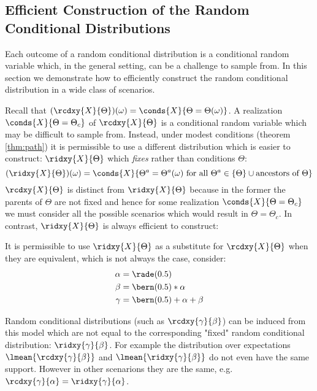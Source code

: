 \subsection{Efficient Construction of the Random Conditional Distributions}

Each outcome of a random conditional distribution is a conditional random variable which, in the general setting, can be a challenge to sample from.
In this section we demonstrate how to efficiently construct the random conditional distribution in a wide class of scenarios.

Recall that $(\rcdxy{X}{\Theta})(\omega) = \conds{X}{\Theta = \Theta(\omega)}$.
A realization $\conds{X}{\Theta = \Theta_c}$ of $\rcdxy{X}{\Theta}$ is a conditional random variable which may be difficult to sample from.
Instead, under modest conditions (theorem \ref{thm:path}) it is permissible to use a different distribution which is easier to construct:  $\ridxy{X}{\Theta}$ which \emph{fixes} rather than conditions $\Theta$:
\begin{equation}\label{eq:rid}
(\ridxy{X}{\Theta})(\omega) = \conds{X}{\Theta^a = \Theta^a(\omega) \text{ for all } \Theta^a \in \{ \Theta \} \cup \text{ancestors of } \Theta}
\end{equation} 
$\rcdxy{X}{\Theta}$ is distinct from $\ridxy{X}{\Theta}$ because in the former the parents of $\Theta$ are not fixed and hence for some realization $\conds{X}{\Theta = \Theta_c}$ we must consider all the possible scenarios which would result in $\Theta = \Theta_c$.
In contrast, 
$\ridxy{X}{\Theta}$ is always efficient to construct:

\begin{algorithm} 
\end{algorithm}

It is permissible to use $\ridxy{X}{\Theta}$ as a substitute for $\rcdxy{X}{\Theta}$ when they are equivalent, which is not always the case, consider:
\begin{align*}
\alpha &= \rade(0.5) \\
\beta &= \bern(0.5) * \alpha \\
\gamma &= \bern(0.5) + \alpha + \beta
\end{align*}

Random conditional distributions (such as $\rcdxy{\gamma}{\beta}$) can be induced from this model which are not equal to the corresponding "fixed" random conditional distribution: $\ridxy{\gamma}{\beta}$.
For example the distribution over expectations $\lmean{\rcdxy{\gamma}{\beta}}$ and $\lmean{\ridxy{\gamma}{\beta}}$ do not even have the same support.
However in other scenarions they are the same, e.g. $\rcdxy{\gamma}{\alpha} = \ridxy{\gamma}{\alpha}$.

